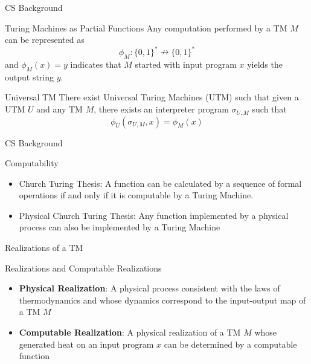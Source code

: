 \documentclass{beamer}
\begin{document}
\begin{frame}{CS Background}
    \begin{block}{Turing Machines as Partial Functions}
    Any computation performed by a TM $M$ can be represented as
    \begin{equation*}
        \phi_M:\{0,1\}^* \nrightarrow \{0,1\}^*
    \end{equation*}
    and $\phi_M(x) = y$ indicates that $M$ started with input program $x$ yields the output string $y$.
    \end{block}
    \begin{block}{Universal TM}
    There exist Universal Turing Machines (UTM) such that given a UTM $U$ and any TM $M$, there exists an interpreter program $\sigma_{U,M}$ such that
    \begin{equation*}
        \phi_U(\sigma_{U,M},x) = \phi_M(x)
    \end{equation*}
    \end{block}
\end{frame}

\begin{frame}{CS Background}
    \begin{block}{Computability}
    \begin{itemize}
        \item Church Turing Thesis: A function can be calculated by a sequence of formal operations if and only if it is computable by a Turing Machine.
       \item Physical Church Turing Thesis: Any function implemented by a physical process can also be implemented by a Turing Machine
    \end{itemize}
    \end{block}
\end{frame}



\begin{frame}{Realizations of a TM}
    \begin{block}{Realizations and Computable Realizations}
    \begin{itemize}
        \item \textbf{Physical Realization}: A physical process consistent with the laws of thermodynamics and whose dynamics correspond to the input-output map of a TM $M$
        \item \textbf{Computable Realization}: A physical realization of a TM $M$ whose generated heat on an input program $x$ can be determined by a computable function
    \end{itemize}
    \end{block}
\end{frame}
\end{document}
